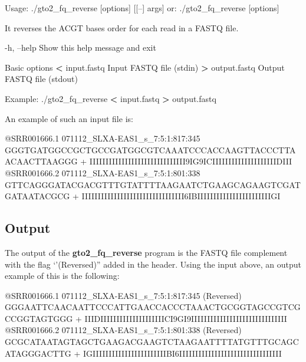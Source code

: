 \documentclass[11pt,]{krantz}
\newenvironment{Shaded}{\begin{snugshade}}{\end{snugshade}}
\newcommand{\OperatorTok}[1]{\textcolor[rgb]{0.43,0.43,0.43}{\textbf{#1}}}
\newcommand{\ExtensionTok}[1]{#1}
\newcommand{\NormalTok}[1]{#1}
\begin{document}
\begin{Shaded}
\begin{Highlighting}[]
\ExtensionTok{Usage}\NormalTok{: ./gto2_fq_reverse [options] [[--] args]}
   \ExtensionTok{or}\NormalTok{: ./gto2_fq_reverse [options]}

\ExtensionTok{It}\NormalTok{ reverses the ACGT bases order for each read in a FASTQ }
\ExtensionTok{file.}

    \ExtensionTok{-h}\NormalTok{, --help            Show this help message and exit}

\ExtensionTok{Basic}\NormalTok{ options}
    \OperatorTok{<} \ExtensionTok{input.fastq}\NormalTok{         Input FASTQ file (stdin)}
    \OperatorTok{>} \ExtensionTok{output.fastq}\NormalTok{        Output FASTQ file (stdout)}

\ExtensionTok{Example}\NormalTok{: ./gto2_fq_reverse }\OperatorTok{<}\NormalTok{ input.fastq }\OperatorTok{>}\NormalTok{ output.fastq}
\end{Highlighting}
\end{Shaded}

An example of such an input file is:

\begin{Shaded}
\begin{Highlighting}[]
\ExtensionTok{@SRR001666.1}\NormalTok{ 071112_SLXA-EAS1_s_7:5:1:817:345}
\ExtensionTok{GGGTGATGGCCGCTGCCGATGGCGTCAAATCCCACCAAGTTACCCTTAACAACTTAAGGG}
\ExtensionTok{+}
\ExtensionTok{IIIIIIIIIIIIIIIIIIIIIIIIIIIIII9IG9ICIIIIIIIIIIIIIIIIIIIIDIII}
\ExtensionTok{@SRR001666.2}\NormalTok{ 071112_SLXA-EAS1_s_7:5:1:801:338}
\ExtensionTok{GTTCAGGGATACGACGTTTGTATTTTAAGAATCTGAAGCAGAAGTCGATGATAATACGCG}
\ExtensionTok{+}
\ExtensionTok{IIIIIIIIIIIIIIIIIIIIIIIIIIIIIIII6IBIIIIIIIIIIIIIIIIIIIIIIIGI}
\end{Highlighting}
\end{Shaded}

\subsection*{Output}\label{output-22}


The output of the \textbf{gto2\_fq\_reverse} program is the FASTQ file
complement with the flag `'(Reversed)'' added in the header. Using the
input above, an output example of this is the following:

\begin{Shaded}
\begin{Highlighting}[]
\ExtensionTok{@SRR001666.1}\NormalTok{ 071112_SLXA-EAS1_s_7:5:1:817:345 (Reversed)}
\ExtensionTok{GGGAATTCAACAATTCCCATTGAACCACCCTAAACTGCGGTAGCCGTCGCCGGTAGTGGG}
\ExtensionTok{+}
\ExtensionTok{IIIDIIIIIIIIIIIIIIIIIIIICI9GI9IIIIIIIIIIIIIIIIIIIIIIIIIIIIII}
\ExtensionTok{@SRR001666.2}\NormalTok{ 071112_SLXA-EAS1_s_7:5:1:801:338 (Reversed)}
\ExtensionTok{GCGCATAATAGTAGCTGAAGACGAAGTCTAAGAATTTTATGTTTGCAGCATAGGGACTTG}
\ExtensionTok{+}
\ExtensionTok{IGIIIIIIIIIIIIIIIIIIIIIIIBI6IIIIIIIIIIIIIIIIIIIIIIIIIIIIIIII}
\end{Highlighting}
\end{Shaded}
\end{document}
